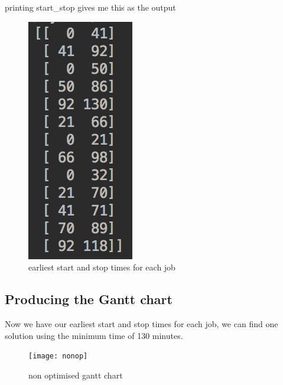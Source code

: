 \documentclass[paper=a4, fontsize=12pt]{scrartcl} %
\numberwithin{equation}{section}       %
\numberwithin{figure}{section}         %
\numberwithin{table}{section}          %
\begin{document}
printing start\_stop gives me this as the output

\begin{figure}[h]
\caption{earliest start and stop times for each job}
\centering
\includegraphics[scale=0.8]{lists}
\end{figure}

\subsection{Producing the Gantt chart}

Now we have our earliest start and stop times for each job, we can find one solution using the minimum time of 130 minutes.

\begin{figure}[h]
\caption{non optimised gantt chart}
\centering
\texttt{[image: nonop]}
\end{figure}
\end{document}
